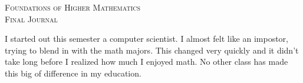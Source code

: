\documentclass{article}
\begin{document}

\begin{center}
\textsc{\Large Foundations of Higher Mathematics}\\[.3cm]
\textsc{\Large Final Journal}\\[1cm]
\end{center}




I started out this semester a computer scientist.
I almost felt like an impostor, trying to blend in with the math majors.
This changed very quickly and it didn't take long before I realized how much I enjoyed math.
No other class has made this big of difference in my education.
\end{document}
